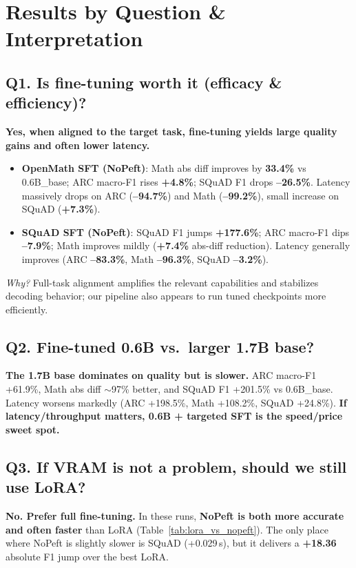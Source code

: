 \documentclass[11pt,a4paper]{article}
\begin{document}
\section{Results by Question \& Interpretation}

\subsection*{\textbf{Q1. Is fine-tuning worth it (efficacy \& efficiency)?}}
\textbf{Yes, when aligned to the target task, fine-tuning yields large quality gains and often lower latency.} 
\begin{itemize}
  \item \textbf{OpenMath SFT (NoPeft)}: Math abs diff improves by \textbf{33.4\%} vs 0.6B\_base; ARC macro-F1 rises \textbf{+4.8\%}; SQuAD F1 drops \textbf{--26.5\%}. Latency massively drops on ARC (\textbf{--94.7\%}) and Math (\textbf{--99.2\%}), small increase on SQuAD (\textbf{+7.3\%}).
  \item \textbf{SQuAD SFT (NoPeft)}: SQuAD F1 jumps \textbf{+177.6\%}; ARC macro-F1 dips \textbf{--7.9\%}; Math improves mildly (\textbf{+7.4\%} abs-diff reduction). Latency generally improves (ARC \textbf{--83.3\%}, Math \textbf{--96.3\%}, SQuAD \textbf{--3.2\%}).
\end{itemize}
\textit{Why?} Full-task alignment amplifies the relevant capabilities and stabilizes decoding behavior; our pipeline also appears to run tuned checkpoints more efficiently.

\subsection*{\textbf{Q2. Fine-tuned 0.6B vs.\ larger 1.7B base?}}
\textbf{The 1.7B base dominates on quality but is slower.} 
ARC macro-F1 +61.9\%, Math abs diff $\sim$97\% better, and SQuAD F1 +201.5\% vs 0.6B\_base. Latency worsens markedly (ARC +198.5\%, Math +108.2\%, SQuAD +24.8\%). 
\textbf{If latency/throughput matters, 0.6B + targeted SFT is the speed/price sweet spot.}

\subsection*{\textbf{Q3. If VRAM is not a problem, should we still use LoRA?}}
\textbf{No. Prefer full fine-tuning.} In these runs, \textbf{NoPeft is both more accurate and often faster} than LoRA (Table~\ref{tab:lora_vs_nopeft}). The only place where NoPeft is slightly slower is SQuAD (+0.029\,s), but it delivers a \textbf{+18.36} absolute F1 jump over the best LoRA.
\end{document}
